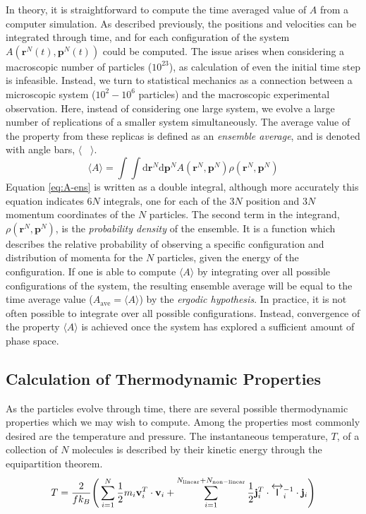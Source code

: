 In theory, it is straightforward to compute the time averaged value of
$A$ from a computer simulation. As described previously, the positions
and velocities can be integrated through time, and for each
configuration of the system $A(\mathbf{r}^N(t),\mathbf{p}^N(t))$ could
be computed. The issue arises when considering a macroscopic number of
particles ($10^{23}$), as calculation of even the initial time step is
infeasible. Instead, we turn to statistical mechanics as a connection
between a microscopic system ($10^2 - 10^6$ particles) and the
macroscopic experimental observation. Here, instead of considering one
large system, we evolve a large number of replications of a smaller
system simultaneously. The average value of the property from these
replicas is defined as an \textit{ensemble average}, and is denoted
with angle bars, $\langle$~ $\rangle$.
\begin{equation}\label{eq:A-ens}
\langle A \rangle = \int \int \mathrm{d}\mathbf{r}^N \mathrm{d}\mathbf{p}^N
A(\mathbf{r}^N,\mathbf{p}^N) \rho
(\mathbf{r}^N,\mathbf{p}^N)
\end{equation}
Equation \eqref{eq:A-ens} is written as a double integral, although
more accurately this equation indicates $6N$ integrals, one for each
of the $3N$ position and $3N$ momentum coordinates of the $N$
particles. The second term in the integrand,
$ \rho(\mathbf{r}^N,\mathbf{p}^N)$, is the \textit{probability
  density} of the ensemble. It is a function which describes the
relative probability of observing a specific configuration and
distribution of momenta for the $N$ particles, given the energy of the
configuration. If one is able to compute $\langle A \rangle$ by
integrating over all possible configurations of the system, the
resulting ensemble average will be equal to the time average value
($A_{\mathrm{ave}} = \langle A \rangle$) by the \textit{ergodic
  hypothesis}. In practice, it is not often possible to integrate over
all possible configurations. Instead, convergence of the property
$\langle A \rangle$ is achieved once the system has explored a
sufficient amount of phase space.

\subsection{Calculation of Thermodynamic Properties}
As the particles evolve through time, there are several possible
thermodynamic properties which we may wish to compute. Among the
properties most commonly desired are the temperature and pressure.
The instantaneous temperature, $T$, of a collection of $N$ molecules
is described by their kinetic energy through the equipartition
theorem.
\begin{equation}\label{Temperature}
T = \frac{2}{fk_B}\Bigg( \sum_{i=1}^{N} \frac{1}{2} m_i {\bf v}_i^T \cdot {\bf v}_i +
\sum_{i=1}^{N_{\mathrm{linear}}+N_{\mathrm{non-linear}}}  \frac{1}{2} {\bf j}_i^T \cdot
\overleftrightarrow{\mathsf{I}}_i^{-1} \cdot {\bf j}_i  \Bigg)
\end{equation}

